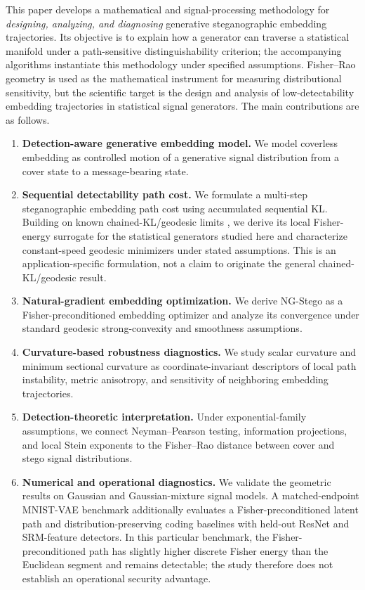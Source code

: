 \documentclass[a4paper,fleqn]{cas-dc}
\begin{document}
This paper develops a mathematical and signal-processing methodology for
\emph{designing, analyzing, and diagnosing} generative steganographic
embedding trajectories. Its objective is to explain how a generator
can traverse a statistical manifold under a path-sensitive
distinguishability criterion; the accompanying algorithms instantiate
this methodology under specified assumptions. Fisher--Rao geometry is used as the mathematical
instrument for measuring distributional sensitivity, but the scientific target
is the design and analysis of low-detectability embedding trajectories in
statistical signal generators. The main contributions are as follows.

\begin{enumerate}
  \item \textbf{Detection-aware generative embedding model.}
  We model coverless embedding as controlled motion of a generative signal
  distribution from a cover state to a message-bearing state.

  \item \textbf{Sequential detectability path cost.}
  We formulate a multi-step steganographic embedding path cost using
  accumulated sequential KL. Building on known chained-KL/geodesic limits
  \cite{pavlichin2016chained}, we derive its local Fisher-energy surrogate
  for the statistical generators studied here and characterize
  constant-speed geodesic minimizers under stated assumptions.
  This is an application-specific formulation, not a claim to originate
  the general chained-KL/geodesic result.

  \item \textbf{Natural-gradient embedding optimization.}
  We derive NG-Stego as a Fisher-preconditioned embedding optimizer and analyze
  its convergence under standard geodesic strong-convexity and smoothness
  assumptions.

  \item \textbf{Curvature-based robustness diagnostics.}
  We study scalar curvature and minimum sectional curvature as
  coordinate-invariant descriptors of local path instability, metric anisotropy,
  and sensitivity of neighboring embedding trajectories.

  \item \textbf{Detection-theoretic interpretation.}
  Under exponential-family assumptions, we connect Neyman--Pearson testing,
  information projections, and local Stein exponents to the Fisher--Rao
  distance between cover and stego signal distributions.

  \item \textbf{Numerical and operational diagnostics.}
  We validate the geometric results on Gaussian and Gaussian-mixture signal
  models. A matched-endpoint MNIST-VAE benchmark additionally evaluates a
  Fisher-preconditioned latent path and distribution-preserving coding
  baselines with held-out ResNet and SRM-feature detectors. In this particular
  benchmark, the Fisher-preconditioned path has slightly higher discrete
  Fisher energy than the Euclidean segment and remains detectable; the study
  therefore does not establish an operational security advantage.
\end{enumerate}
\end{document}

